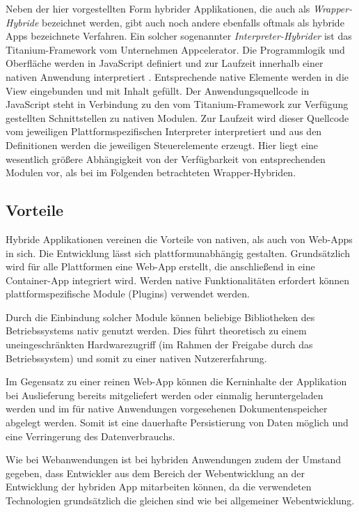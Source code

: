 Neben der hier vorgestellten Form hybrider Applikationen, die auch als \emph{Wrapper-Hybride} bezeichnet werden, gibt auch noch andere ebenfalls oftmals als hybride Apps bezeichnete Verfahren. Ein solcher sogenannter \emph{Interpreter-Hybrider} ist das Titanium-Framework vom Unternehmen Appcelerator. Die Programmlogik und Oberfläche werden in JavaScript definiert und zur Laufzeit
innerhalb einer nativen Anwendung interpretiert \cite{titaniumAbout}. Entsprechende
native Elemente werden in die View eingebunden und mit Inhalt gefüllt. Der Anwendungsquellcode in JavaScript steht in Verbindung zu den vom Titanium-Framework zur Verfügung gestellten Schnittstellen zu nativen Modulen. Zur Laufzeit wird dieser Quellcode vom jeweiligen Plattformspezifischen Interpreter interpretiert und aus den Definitionen werden die jeweiligen Steuerelemente erzeugt. Hier liegt eine wesentlich größere Abhängigkeit von der Verfügbarkeit von entsprechenden Modulen vor, als bei im Folgenden betrachteten Wrapper-Hybriden.
%
\subsection{Vorteile}
%
Hybride Applikationen vereinen die Vorteile von nativen, als auch von Web-Apps in sich. Die Entwicklung lässt sich plattformunabhängig gestalten. Grundsätzlich wird für alle Plattformen eine Web-App erstellt, die anschließend in eine Container-App integriert wird. Werden native Funktionalitäten erfordert können plattformspezifische Module (Plugins) verwendet werden.

Durch die Einbindung solcher Module können beliebige Bibliotheken des Betriebssystems nativ genutzt werden. Dies führt theoretisch zu einem uneingeschränkten Hardwarezugriff (im Rahmen der Freigabe durch das Betriebssystem) und somit zu einer nativen Nutzererfahrung. 

Im Gegensatz zu einer reinen Web-App können die Kerninhalte der Applikation bei Auslieferung bereits mitgeliefert werden oder einmalig heruntergeladen werden und im für native Anwendungen vorgesehenen Dokumentenspeicher abgelegt werden. Somit ist eine dauerhafte Persistierung von Daten möglich und eine Verringerung des Datenverbrauchs.

Wie bei Webanwendungen ist bei hybriden Anwendungen zudem der Umstand gegeben, dass Entwickler aus dem Bereich der Webentwicklung an der Entwicklung der hybriden App mitarbeiten können, da die verwendeten Technologien grundsätzlich die gleichen sind wie bei allgemeiner Webentwicklung. 
%
